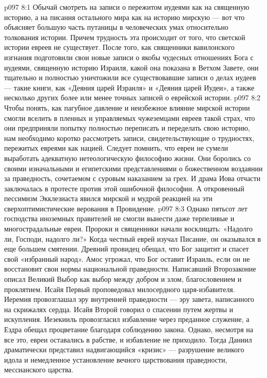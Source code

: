 \vs p097 8:1 Обычай смотреть на записи о пережитом иудеями как на священную историю, а на писания остального мира как на историю мирскую --- вот что объясняет большую часть путаницы в человеческих умах относительно толкования истории. Причем трудность эта происходит от того, что светской истории евреев не существует. После того, как священники вавилонского изгнания подготовили свои новые записи о якобы чудесных отношениях Бога с иудеями, священную историю Израиля, какой она показана в Ветхом Завете, они тщательно и полностью уничтожили все существовавшие записи о делах иудеев --- такие книги, как «Деяния царей Израиля» и «Деяния царей Иудеи», а также несколько других более или менее точных записей о еврейской истории.
\vs p097 8:2 Чтобы понять, как пагубное давление и неизбежное влияние мирской истории смогли вселить в пленных и управляемых чужеземцами евреев такой страх, что они предприняли попытку полностью переписать и переделать свою историю, нам необходимо коротко рассмотреть записи, свидетельствующие о трудностях, пережитых евреями как нацией. Следует помнить, что евреи не сумели выработать адекватную нетеологическую философию жизни. Они боролись со своими изначальными и египетскими представлениями о божественном воздаянии за праведность, сочетаемом с суровым наказанием за грех. И драма Иова отчасти заключалась в протесте против этой ошибочной философии. А откровенный пессимизм Экклезиаста явился мирской и мудрой реакцией на эти сверхоптимистические верования в Провидение.
\vs p097 8:3 Однако пятьсот лет господства иноземных правителей не смогли вынести даже терпеливые и многострадальные евреи. Пророки и священники начали восклицать: «Надолго ли, Господи, надолго ли?» Когда честный еврей изучал Писание, он оказывался в еще большем смятении. Древний провидец обещал, что Бог защитит и спасет свой «избранный народ». Амос угрожал, что Бог оставит Израиль, если он не восстановит свои нормы национальной праведности. Написавший Второзаконие описал Великий Выбор как выбор между добром и злом, благословением и проклятием. Исайя Первый проповедовал милосердного царя\hyp{}избавителя. Иеремия провозглашал эру внутренней праведности --- эру завета, написанного на скрижалях сердца. Исайя Второй говорил о спасении путем жертвы и искупления. Иезекииль провозгласил избавление через преданное служение, а Ездра обещал процветание благодаря соблюдению закона. Однако, несмотря на все это, евреи оставались в рабстве, и избавление не приходило. Тогда Даниил драматически представил надвигающийся «кризис» --- разрушение великого идола и немедленное установление вечного царствования праведности, мессианского царства.
